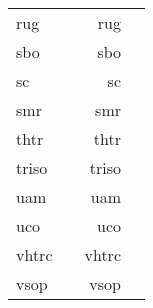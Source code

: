 \begin{longtable}{p{25mm} p{50mm} rp{75mm}}
\acrshort{rug} & & \acrlong{rug} \\
\acrshort{sbo} & & \acrlong{sbo} \\
\acrshort{sc} & & \acrlong{sc} \\
\acrshort{smr} & & \acrlong{smr} \\
\acrshort{thtr} & & \acrlong{thtr} \\
\acrshort{triso} & & \acrlong{triso} \\
\acrshort{uam} & & \acrlong{uam} \\
\acrshort{uco} & & \acrlong{uco} \\
\acrshort{vhtrc} & & \acrlong{vhtrc} \\
\acrshort{vsop} & & \acrlong{vsop}
\end{longtable}
